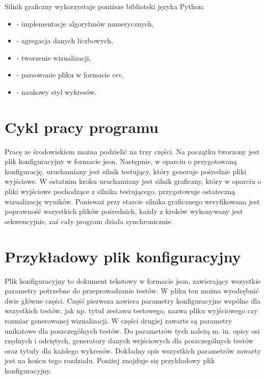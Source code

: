 Silnik graficzny wykorzystuje poniższe biblioteki języka Python:
\begin{itemize}
	\setlength\itemsep{0em}
	\item {} - implementacje algorytmów numerycznych,
	\item {} - agregacja danych liczbowych,
	\item {} - tworzenie wizualizacji,
	\item {} - parsowanie pliku w formacie csv,
	\item {} - naukowy styl wykresów.
\end{itemize}

\section{Cykl pracy programu}
Pracę ze środowiskiem można podzielić na trzy części. Na początku tworzony jest plik konfiguracyjny w formacie json.
Następnie, w oparciu o przygotowaną konfigurację, uruchamiany jest silnik testujący, który generuje pośrednie pliki wyjściowe. W ostatnim kroku uruchamiany jest silnik graficzny, który w oparciu o pliki wyjściowe pochodzące z silnika testującego, przygotowuje ostateczną wizualizację wyników. Ponieważ przy starcie silnika graficznego weryfikowana jest poprawność wszystkich plików pośrednich, każdy z kroków wykonywany jest sekwencyjnie, zaś cały program działa synchronicznie.\\

\section{Przykładowy plik konfiguracyjny}
Plik konfiguracyjny to dokument tekstowy w formacie json, zawierający wszystkie parametry potrzebne do przeprowadzanie testów.
W pliku ten można wyodrębnić dwie główne części. Część pierwsza zawiera parametry konfiguracyjne wspólne dla wszystkich testów, jak np. tytuł zestawu testowego, nazwa pliku wyjściowego czy rozmiar generowanej wizualizacji. W części drugiej zawarte są parametry unikatowe dla poszczególnych testów. Do parametrów tych należą m. in. opisy osi rzędnych i odciętych, generatory danych wejściowych dla poszczególnych testów oraz tytuły dla każdego wykresów. Dokładny spis wszystkich parametrów zawarty jest na końcu tego rozdziału. Poniżej znajduje się przykładowy plik konfiguracyjny.

\newpage




